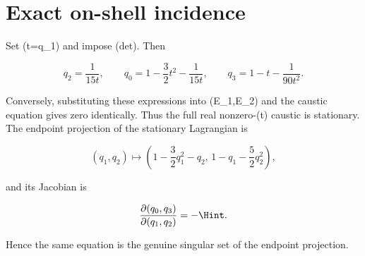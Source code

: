 \section{Exact on-shell incidence}

Set (t=q_1) and impose (det).  Then

\[
q_2=\frac1{15t},\qquad
q_0=1-\frac32t^2-\frac1{15t},\qquad
q_3=1-t-\frac1{90t^2}.
\]

Conversely, substituting these expressions into (E_1,E_2) and the caustic
equation gives zero identically.  Thus the full real nonzero-(t) caustic is
stationary.  The endpoint projection of the stationary Lagrangian is

\[
(q_1,q_2)\longmapsto
\left(1-\frac32q_1^2-q_2,\,1-q_1-\frac52q_2^2\right),
\]

and its Jacobian is

\[
\frac{\partial(q_0,q_3)}{\partial(q_1,q_2)}
=-\Hint.
\]

Hence the same equation is the genuine singular set of the endpoint
projection.
